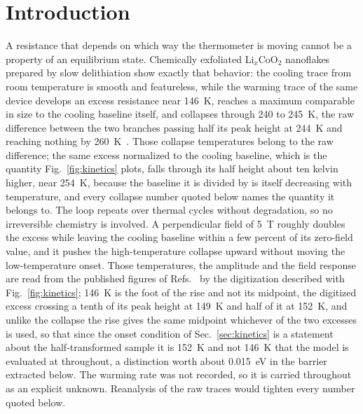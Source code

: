 \documentclass[reprint,twocolumn,prb,amsmath,amssymb,superscriptaddress,floatfix]{revtex4-2}
\begin{document}
\section{Introduction}
\label{sec:intro}

A resistance that depends on which way the thermometer is moving cannot be a property of an
equilibrium state. Chemically exfoliated Li$_x$CoO$_2$ nanoflakes prepared by slow
delithiation show exactly that behavior: the cooling trace from room temperature is smooth and
featureless, while the warming trace of the same device develops an excess resistance near
146~K, reaches a maximum comparable in size to the cooling baseline itself, and collapses
through 240 to 245~K, the raw difference between the two branches passing half its peak height
at 244~K and reaching nothing by 260~K~\cite{Crowley2020,RadhaPerspective2021}. Those collapse
temperatures belong to the raw difference; the same excess normalized to the cooling baseline,
which is the quantity Fig.~\ref{fig:kinetics} plots, falls through its half height about ten
kelvin higher, near 254~K, because the baseline it is divided by is itself decreasing with
temperature, and every collapse number quoted below names the quantity it belongs
to. The loop repeats over thermal cycles
without degradation, so no irreversible chemistry is involved. A perpendicular field of 5~T
roughly doubles the excess while leaving the cooling baseline within a few percent of its
zero-field value, and it pushes the high-temperature collapse upward without moving the
low-temperature onset. Those temperatures, the amplitude and the field response are read from
the published figures of Refs.~\cite{Crowley2020,RadhaPerspective2021} by the digitization
described with Fig.~\ref{fig:kinetics}; 146~K is the foot of the rise and not its midpoint, the
digitized excess crossing a tenth of its peak height at 149~K and half of it at 152~K, and
unlike the collapse the rise gives the same midpoint whichever of the two excesses is used, so
that since the onset condition of Sec.~\ref{sec:kinetics} is a statement about the
half-transformed sample it is 152~K and not 146~K that the model is evaluated at throughout, a
distinction worth about 0.015~eV in the barrier extracted below. The warming rate was not
recorded, so it is carried throughout as an explicit unknown. Reanalysis of the raw traces would
tighten every number quoted below.
\end{document}
